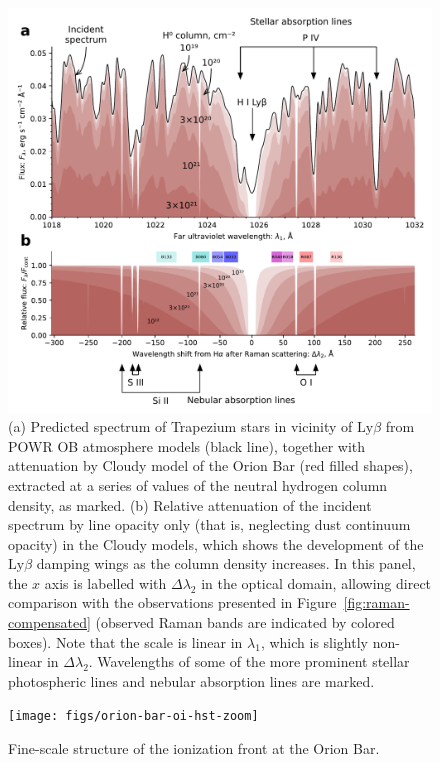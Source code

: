 \documentclass[times]{aastex63}
\newcommand\lyb{\ensuremath{\text{Ly}\beta}}
\begin{document}
\begin{figure}
  \includegraphics[width=\linewidth]{figs/stellar-spectrum-fuv}
  \caption{(a) Predicted spectrum of Trapezium stars in vicinity of
    \lyb{} from POWR OB atmosphere models (black line), together with
    attenuation by Cloudy model of the Orion Bar (red filled shapes),
    extracted at a series of values of the neutral hydrogen column
    density, as marked. (b) Relative attenuation of the incident
    spectrum by line opacity only (that is, neglecting dust continuum
    opacity) in the Cloudy models, which shows the development of the
    \lyb{} damping wings as the column density increases.  In this
    panel, the \(x\) axis is labelled with \(\Delta\lambda_2\) in the optical
    domain, allowing direct comparison with the observations presented
    in Figure~\ref{fig:raman-compensated} (observed Raman bands are
    indicated by colored boxes). Note that the scale is linear in
    \(\lambda_1\), which is slightly non-linear in
    \(\Delta\lambda_2\).  Wavelengths of some of the more prominent stellar
    photospheric lines and nebular absorption lines are marked. }
  \label{fig:stellar-spectrum-fuv}
\end{figure}


\begin{figure}
  \texttt{[image: figs/orion-bar-oi-hst-zoom]}
  \caption{Fine-scale structure of the ionization front at the Orion Bar.}
  \label{fig:bar-oi-hst}
\end{figure}
\end{document}
